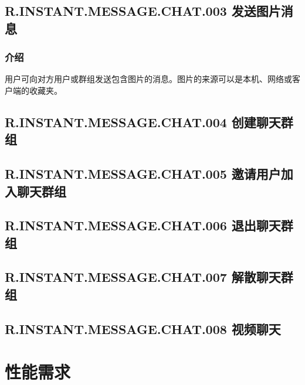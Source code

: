 \subsection{R.INSTANT.MESSAGE.CHAT.003 发送图片消息}
\subsubsection{介绍}
用户可向对方用户或群组发送包含图片的消息。图片的来源可以是本机、网络或客户端的收藏夹。

\subsection{R.INSTANT.MESSAGE.CHAT.004 创建聊天群组}
\subsection{R.INSTANT.MESSAGE.CHAT.005 邀请用户加入聊天群组}
\subsection{R.INSTANT.MESSAGE.CHAT.006 退出聊天群组}
\subsection{R.INSTANT.MESSAGE.CHAT.007 解散聊天群组}

\subsection{R.INSTANT.MESSAGE.CHAT.008 视频聊天}




\section{性能需求}

